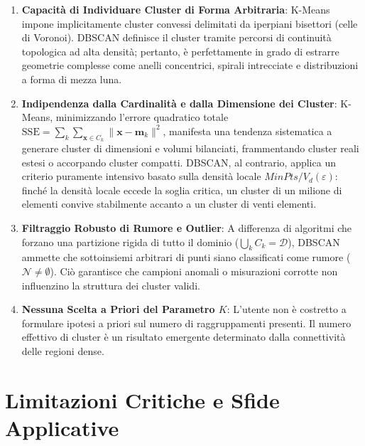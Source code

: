 \begin{enumerate}
    \item \textbf{Capacità di Individuare Cluster di Forma Arbitraria}:
    K-Means impone implicitamente cluster convessi delimitati da iperpiani bisettori (celle di Voronoi). DBSCAN definisce il cluster tramite percorsi di continuità topologica ad alta densità; pertanto, è perfettamente in grado di estrarre geometrie complesse come anelli concentrici, spirali intrecciate e distribuzioni a forma di mezza luna.
    
    \item \textbf{Indipendenza dalla Cardinalità e dalla Dimensione dei Cluster}:
    K-Means, minimizzando l'errore quadratico totale $\mathrm{SSE} = \sum_k \sum_{\mathbf{x} \in C_k} \|\mathbf{x} - \mathbf{m}_k\|^2$, manifesta una tendenza sistematica a generare cluster di dimensioni e volumi bilanciati, frammentando cluster reali estesi o accorpando cluster compatti. DBSCAN, al contrario, applica un criterio puramente intensivo basato sulla densità locale $MinPts / V_d(\varepsilon)$: finché la densità locale eccede la soglia critica, un cluster di un milione di elementi convive stabilmente accanto a un cluster di venti elementi.

    \item \textbf{Filtraggio Robusto di Rumore e Outlier}:
    A differenza di algoritmi che forzano una partizione rigida di tutto il dominio ($\bigcup_k C_k = \mathcal{D}$), DBSCAN ammette che sottoinsiemi arbitrari di punti siano classificati come rumore ($\mathcal{N} \ne \emptyset$). Ciò garantisce che campioni anomali o misurazioni corrotte non influenzino la struttura dei cluster validi.

    \item \textbf{Nessuna Scelta a Priori del Parametro $K$}:
    L'utente non è costretto a formulare ipotesi a priori sul numero di raggruppamenti presenti. Il numero effettivo di cluster è un risultato emergente determinato dalla connettività delle regioni dense.
\end{enumerate}

\section{Limitazioni Critiche e Sfide Applicative}
\label{sec:dm-dbscan-limitations}

